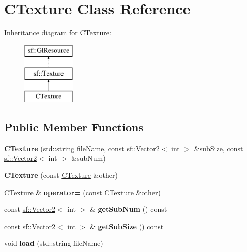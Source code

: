 \hypertarget{classCTexture}{\section{C\-Texture Class Reference}
\label{classCTexture}
}
Inheritance diagram for C\-Texture\-:\begin{figure}[H]
\begin{center}
\leavevmode
\includegraphics[height=3.000000cm]{classCTexture}
\end{center}
\end{figure}
\subsection*{Public Member Functions}
\begin{DoxyCompactItemize}
\item 
\hypertarget{classCTexture_a03a03314b328783682d200443b561890}{{\bfseries C\-Texture} (std\-::string file\-Name, const \hyperlink{classsf_1_1Vector2}{sf\-::\-Vector2}$<$ int $>$ \&sub\-Size, const \hyperlink{classsf_1_1Vector2}{sf\-::\-Vector2}$<$ int $>$ \&sub\-Num)}\label{classCTexture_a03a03314b328783682d200443b561890}

\item 
\hypertarget{classCTexture_a2bb6709e0d63ccb6fb3219eb5528570f}{{\bfseries C\-Texture} (const \hyperlink{classCTexture}{C\-Texture} \&other)}\label{classCTexture_a2bb6709e0d63ccb6fb3219eb5528570f}

\item 
\hypertarget{classCTexture_ab4f29f7f73e347dfac33672e3b9a64c8}{\hyperlink{classCTexture}{C\-Texture} \& {\bfseries operator=} (const \hyperlink{classCTexture}{C\-Texture} \&other)}\label{classCTexture_ab4f29f7f73e347dfac33672e3b9a64c8}

\item 
\hypertarget{classCTexture_a52a074211eaa812a91200f73f8387aca}{const \hyperlink{classsf_1_1Vector2}{sf\-::\-Vector2}$<$ int $>$ \& {\bfseries get\-Sub\-Num} () const }\label{classCTexture_a52a074211eaa812a91200f73f8387aca}

\item 
\hypertarget{classCTexture_a100f28379f113485d1e7574705ba977f}{const \hyperlink{classsf_1_1Vector2}{sf\-::\-Vector2}$<$ int $>$ \& {\bfseries get\-Sub\-Size} () const }\label{classCTexture_a100f28379f113485d1e7574705ba977f}

\item 
\hypertarget{classCTexture_a0756fcbdac0b2e53cbaea1c35c64a939}{void {\bfseries load} (std\-::string file\-Name)}\label{classCTexture_a0756fcbdac0b2e53cbaea1c35c64a939}

\end{DoxyCompactItemize}
